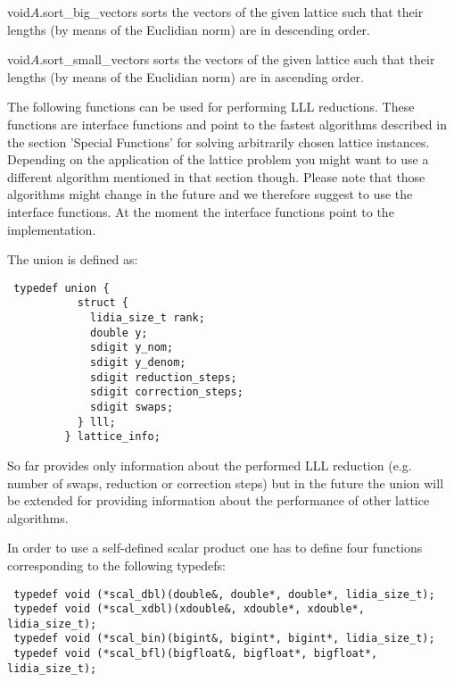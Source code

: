 \begin{fcode}{void}{$A$.sort_big_vectors}{}
  sorts the vectors of the given lattice such that their lengths (by means of the Euclidian
  norm) are in descending order.
\end{fcode}

\begin{fcode}{void}{$A$.sort_small_vectors}{}
  sorts the vectors of the given lattice such that their lengths (by means of the Euclidian
  norm) are in ascending order.
\end{fcode}




The following functions can be used for performing LLL reductions.  These functions are
interface functions and point to the fastest algorithms described in the section 'Special
Functions' for solving arbitrarily chosen lattice instances.  Depending on the application of
the lattice problem you might want to use a different algorithm mentioned in that section
though.  Please note that those algorithms might change in the future and we therefore suggest
to use the interface functions.  At the moment the interface functions point to the
 implementation.

The union  is defined as:
\begin{verbatim}
 typedef union {
           struct {
             lidia_size_t rank;
             double y;
             sdigit y_nom;
             sdigit y_denom;
             sdigit reduction_steps;
             sdigit correction_steps;
             sdigit swaps;
           } lll;
         } lattice_info;
\end{verbatim}
So far  provides only information about the performed LLL reduction (e.g.
number of swaps, reduction or correction steps) but in the future the union will be extended for
providing information about the performance of other lattice algorithms.

In order to use a self-defined scalar product one has to define four functions corresponding to
the following typedefs:

\begin{verbatim}
 typedef void (*scal_dbl)(double&, double*, double*, lidia_size_t);
 typedef void (*scal_xdbl)(xdouble&, xdouble*, xdouble*, lidia_size_t);
 typedef void (*scal_bin)(bigint&, bigint*, bigint*, lidia_size_t);
 typedef void (*scal_bfl)(bigfloat&, bigfloat*, bigfloat*, lidia_size_t);
\end{verbatim}

